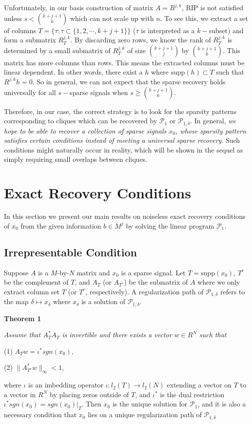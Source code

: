 \documentclass{article}
\begin{document}
Unfortunately, in our basis construction of matrix $A=R^{j,k}$, RIP is not satisfied unless $s< {k+j+1\choose k}$ which can not scale up with $n$. 
To see this, we extract a set of columns $T=\{\tau : \tau\subset \{1,2,\cdots, k+j+1\}\}$ ($\tau$ is
interpreted as a $k-$subset) and form a submatrix $R^{j,k}_T$. By discarding zero rows, we know
the rank of $R^{j,k}_T$ is determined by a small submatrix of $R^{j,k}_T$ of size
${k+j+1\choose j}$ by ${k+j+1\choose k}$. This matrix has more columns than rows.
This means the extracted columns must be linear dependent. In other words,
there exist a $h$ where $\mbox{supp}(h)\subset T$ such that $R^{j,k}h=0$.
So in general, we can not expect that the sparse recovery holds universally for all $s-$sparse signals when $s\ge {k+j+1\choose k}$.

Therefore, in our case, the correct strategy is to look for the sparsity patterns corresponding to cliques which can be recovered by $\mathcal{P}_1$ or $\mathcal{P}_{1,\delta}$. In general, {\it we hope to be able to recover a collection of sparse signals $x_0$,  whose sparsity pattern satisfies certain conditions instead of meeting a universal sparse recovery}. Such conditions might naturally occur in reality, which will be shown in the sequel as simply requiring small overlaps between cliques. 

\section{Exact Recovery Conditions}

In this section we present our main results on noiseless exact recovery conditions of $x_0$ from the given information $b\in M^j$ by solving the linear program $\mathcal{P}_1$.  

\subsection{Irrepresentable Condition}

Suppose $A$ is a $M$-by-$N$ matrix and $x_0$ is a sparse signal. 
Let $T=\mbox{supp}(x_0)$, $T^c$ be the complement of $T$, and $A_T$ (or $A_{T^c}$) be the submatrix of $A$ where we only extract column set $T$ (or $T^c$, respectively). A regularization path of $\mathcal{P}_{1,\delta}$ refers to the map $\delta\mapsto x_\delta$ where $x_\delta$ is a solution of $\mathcal{P}_{1,\delta}$.   

\textbf{Theorem 1} {\it Assume that $A_T^*A_T$ is invertible and there exists a vector $w\in R^N$ such that

(1) $A_T w = \iota^*sgn(x_0) $, 

(2)  $\|A^*_{T^c} w \|_\infty < 1$,

where $\iota$ is an imbedding operator $\iota: l_2(T)\to l_2(N)$ extending a vector on $T$ to 
a vector in $R^N$ by placing zeros outside of $T$, and $\iota^*$ is the dual restriction $\iota^*sgn(x_0)=sgn(x_0)|_T$. Then $x_0$ is the unique solution for $\mathcal{P}_1$, and it is also a necessary condition that $x_0$ lies on a unique regularization path of $\mathcal{P}_{1,\delta}$}
\end{document}

